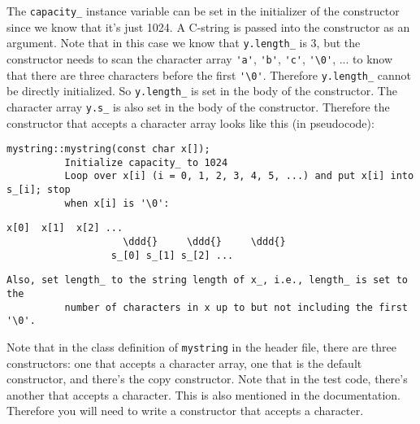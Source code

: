 The \verb!capacity_! instance variable can be set in the initializer of
the constructor since we know that it's
just 1024. A C-string is passed into the constructor as an argument.
Note that in this case we know that
\verb!y.length_! is 3, but the constructor needs to scan the character array
\verb!'a'!, \verb!'b'!, \verb!'c'!, \verb!'\0'!, ... to
know that there are three characters before the first \verb!'\0'!.
Therefore \verb!y.length_! cannot be directly
initialized. So \verb!y.length_! is set in the body of the constructor.
The character array \verb!y.s_! is also set in
the body of the constructor. Therefore the constructor that accepts a
character array looks like this (in
pseudocode):
{\small
\begin{Verbatim}[commandchars = ~\@\!]
       mystring::mystring(const char x[]);
          Initialize capacity_ to 1024
          Loop over x[i] (i = 0, 1, 2, 3, 4, 5, ...) and put x[i] into s_[i]; stop
          when x[i] is '\0':
\end{Verbatim}
}
\newcommand\ddd{$\downarrow$}
{\small
\begin{Verbatim}[commandchars = \\\{\}]
                  x[0]  x[1]  x[2] ...
                    \ddd{}     \ddd{}     \ddd{}
                  s_[0] s_[1] s_[2] ...
\end{Verbatim}
}
{\small
\begin{Verbatim}[commandchars = ~\@\!]
          Also, set length_ to the string length of x_, i.e., length_ is set to the
          number of characters in x up to but not including the first '\0'.
\end{Verbatim}
}
Note that in the class definition of \verb!mystring! in the header file,
there are three constructors: one
that accepts a character array, one that is the default constructor,
and there's the copy constructor. Note that in
the test code, there's another that accepts a character.
This is also mentioned in the documentation.
Therefore you will need to write a constructor that accepts a character.

